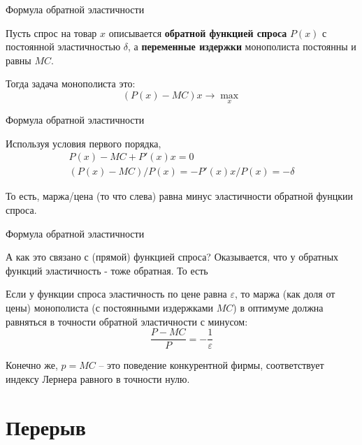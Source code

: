 \documentclass{beamer}
\begin{document}
\begin{frame}{Формула обратной эластичности}

Пусть спрос на товар $x$ описывается \textbf{обратной функцией спроса} $P(x)$ с постоянной эластичностью $\delta$, а \textbf{переменные издержки} монополиста постоянны и равны $MC$. 

Тогда задача монополиста это:
$$ (P(x) - MC)x \to \max_x$$

\end{frame}

\begin{frame}{Формула обратной эластичности}

Используя условия первого порядка,
\begin{gather*}
P(x) - MC + P'(x)x = 0\\
(P(x) - MC)/P(x) = - P'(x)x/P(x) = - \delta
\end{gather*}


То есть, маржа/цена (то что слева) равна минус эластичности обратной фунцкии спроса.
\end{frame}

\begin{frame}{Формула обратной эластичности}

А как это связано с (прямой) функцией спроса? Оказывается, что у обратных функций эластичность - тоже обратная. То есть 

\begin{lemma}
Если у функции спроса эластичность по цене равна $\varepsilon$, то маржа (как доля от цены) монополиста (с постоянными издержками $MC$) в оптимуме должна равняться в точности обратной эластичности с минусом:
$$\frac{P-MC}{P} = - \frac{1}{\varepsilon}$$
\end{lemma}
Конечно же, $p=MC$ – это поведение конкурентной фирмы, соответствует индексу Лернера равного в точности нулю.
\end{frame}

\section{Перерыв}
\end{document}
